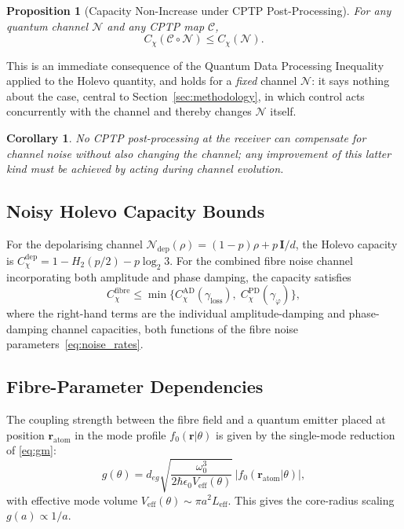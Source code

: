 \documentclass[journal,twocolumn]{IEEEtran}
\theoremstyle{definition}
\theoremstyle{plain}
\newtheorem{corollary}[theorem]{Corollary}
\newtheorem{proposition}[theorem]{Proposition}
\begin{document}
\begin{proposition}[Capacity Non-Increase under CPTP Post-Processing]
\label{thm:capacity_nonincrease}
For any quantum channel $\mathcal{N}$ and any CPTP map
$\mathcal{C}$,
\begin{equation}
  C_\chi(\mathcal{C} \circ \mathcal{N}) \le C_\chi(\mathcal{N}).
  \label{eq:qdpi}
\end{equation}
\end{proposition}

This is an immediate consequence of the Quantum Data Processing
Inequality applied to the Holevo quantity, and holds for a
\emph{fixed} channel $\mathcal N$: it says nothing about the case,
central to Section~\ref{sec:methodology}, in which control acts
concurrently with the channel and thereby changes $\mathcal N$
itself.

\begin{corollary}
No CPTP post-processing at the receiver can compensate for channel
noise \emph{without also changing the channel}; any improvement of
this latter kind must be achieved by acting \emph{during}
channel evolution.
\end{corollary}

\subsection{Noisy Holevo Capacity Bounds}

For the depolarising channel $\mathcal{N}_{\mathrm{dep}}(\rho)
= (1-p)\rho + p\,\mathbf{I}/d$, the Holevo capacity is
$C_\chi^{\mathrm{dep}} = 1 - H_2(p/2) - p\log_2 3$.  For the
combined fibre noise channel incorporating both amplitude and phase
damping, the capacity satisfies
\begin{equation}
  C_\chi^{\mathrm{fibre}} \le
  \min\bigl\{C_\chi^{\mathrm{AD}}(\gamma_{\mathrm{loss}}),\;
             C_\chi^{\mathrm{PD}}(\gamma_\varphi)\bigr\},
  \label{eq:fibre_capacity_bound}
\end{equation}
where the right-hand terms are the individual amplitude-damping and
phase-damping channel capacities, both functions of the fibre noise
parameters~\eqref{eq:noise_rates}.

\subsection{Fibre-Parameter Dependencies}

The coupling strength between the fibre field and a quantum emitter
placed at position $\mathbf{r}_{\mathrm{atom}}$ in the mode profile
$f_0(\mathbf{r}|\theta)$ is given by the single-mode reduction of
\eqref{eq:gm}:
\begin{equation}
  g(\theta) = d_{eg}\sqrt{\frac{\omega_0^3}
    {2\hbar\epsilon_0 V_{\mathrm{eff}}(\theta)}}\,
  \bigl|f_0(\mathbf{r}_{\mathrm{atom}}|\theta)\bigr|,
  \label{eq:coupling}
\end{equation}
with effective mode volume $V_{\mathrm{eff}}(\theta) \sim \pi
a^2 L_{\mathrm{eff}}$.  This gives the core-radius scaling
$g(a) \propto 1/a$.
\end{document}
